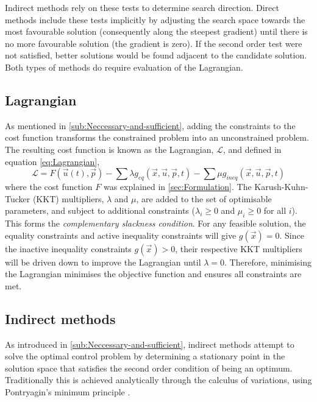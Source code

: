 Indirect methods rely on these tests to determine search direction. Direct methods include these tests implicitly by adjusting the search space towards the most favourable solution (consequently along the steepest gradient) until there is no more favourable solution (the gradient is zero). If the second order test were not satisfied, better solutions would be found adjacent to the candidate solution. Both types of methods do require evaluation of the Lagrangian.

\subsection{Lagrangian} \label{sub:Lagrangian}

As mentioned in \autoref{sub:Neccessary-and-sufficient}, adding the constraints to the cost function transforms the constrained problem into an unconstrained problem. The resulting cost function is known as the Lagrangian, $\mathcal{L}$, and defined in equation \eqref{eq:Lagrangian},
\begin{equation} \label{eq:Lagrangian}
\mathcal{L} = F(\vec{u}(t),\vec{p}) - \sum\lambda g_{eq}(\vec{x},\vec{u},\vec{p},t) - \sum\mu g_{ineq}(\vec{x},\vec{u},\vec{p},t)
\end{equation}
where the cost function $F$ was explained in \autoref{sec:Formulation}. The Karush-Kuhn-Tucker (KKT) multipliers, $\lambda$ and $\mu$, are added to the set of optimisable parameters, and subject to additional constraints ($\lambda_i\ge0$ and $\mu_i\ge0$ for all $i$). This forms the \emph{complementary slackness condition}. For any feasible solution, the equality constraints and active inequality constraints will give $g(\vec{x})=0$.  Since the inactive inequality constraints $g(\vec{x})>0$, their respective KKT multipliers will be driven down to improve the Lagrangian until $\lambda=0$. Therefore, minimising the Lagrangian minimises the objective function and ensures all constraints are met.

\subsection{Indirect methods}

As introduced in \autoref{sub:Neccessary-and-sufficient}, indirect methods attempt to solve the optimal control problem by determining a stationary point in the solution space that satisfies the second order condition of being an optimum. Traditionally this is achieved analytically through the calculus of variations, using Pontryagin's minimum principle \parencite{Pontryagin1962}. 

